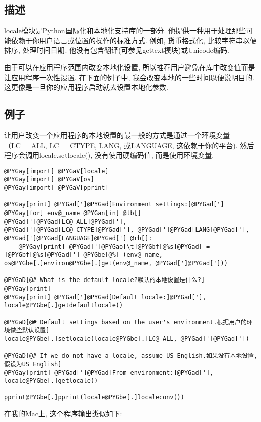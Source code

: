 \documentclass[a4paper,10pt,english]{manual}
\begin{document}
\subsection{描述}

locale模块是Python国际化和本地化支持库的一部分. 他提供一种用于处理那些可能依赖于你用户语言或位置的操作的标准方式. 例如, 货币格式化, 比较字符串以便排序, 处理时间日期. 他没有包含翻译(可参见gettext模块)或Unicode编码.

由于可以在应用程序范围内改变本地化设置, 所以推荐用户避免在库中改变值而是让应用程序一次性设置. 在下面的例子中, 我会改变本地的一些时间以便说明目的.这更像是一旦你的应用程序启动就去设置本地化参数.


\subsection{例子}

让用户改变一个应用程序的本地设置的最一般的方式是通过一个环境变量（LC\_\_ALL, LC\_\_CTYPE, LANG, 或LANGUAGE, 这依赖于你的平台). 然后程序会调用locale.setlocale(), 没有使用硬编码值, 而是使用环境变量.

\begin{Verbatim}[commandchars=@\[\]]
@PYGay[import] @PYGaV[locale]
@PYGay[import] @PYGaV[os]
@PYGay[import] @PYGaV[pprint]

@PYGay[print] @PYGad[']@PYGad[Environment settings:]@PYGad[']
@PYGay[for] env@_name @PYGan[in] @lb[] @PYGad[']@PYGad[LC@_ALL]@PYGad['], @PYGad[']@PYGad[LC@_CTYPE]@PYGad['], @PYGad[']@PYGad[LANG]@PYGad['], @PYGad[']@PYGad[LANGUAGE]@PYGad['] @rb[]:
    @PYGay[print] @PYGad[']@PYGao[\t]@PYGbf[@%s]@PYGad[ = ]@PYGbf[@%s]@PYGad['] @PYGbe[@%] (env@_name, os@PYGbe[.]environ@PYGbe[.]get(env@_name, @PYGad[']@PYGad[']))

@PYGaD[@# What is the default locale?默认的本地设置是什么?]
@PYGay[print]
@PYGay[print] @PYGad[']@PYGad[Default locale:]@PYGad['], locale@PYGbe[.]getdefaultlocale()

@PYGaD[@# Default settings based on the user's environment.根据用户的环境做些默认设置]
locale@PYGbe[.]setlocale(locale@PYGbe[.]LC@_ALL, @PYGad[']@PYGad['])

@PYGaD[@# If we do not have a locale, assume US English.如果没有本地设置, 假设为US English]
@PYGay[print] @PYGad[']@PYGad[From environment:]@PYGad['], locale@PYGbe[.]getlocale()

pprint@PYGbe[.]pprint(locale@PYGbe[.]localeconv())
\end{Verbatim}

在我的Mac上, 这个程序输出类似如下:
\end{document}
